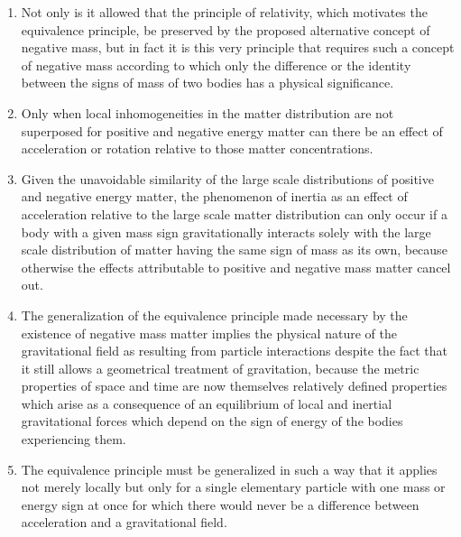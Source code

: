 \documentclass[notitlepage,12pt]{report}
\begin{document}
\begin{enumerate}
\item Not only is it allowed that the principle of relativity, which motivates the equivalence principle, be preserved by the proposed alternative concept of negative mass, but in fact it is this very principle that requires such a concept of negative mass according to which only the difference or the identity between the signs of mass of two bodies has a physical significance.

\item Only when local inhomogeneities in the matter distribution are not superposed for positive and negative energy matter can there be an effect of acceleration or rotation relative to those matter concentrations.

\item Given the unavoidable similarity of the large scale distributions of positive and negative energy matter, the phenomenon of inertia as an effect of acceleration relative to the large scale matter distribution can only occur if a body with a given mass sign gravitationally interacts solely with the large scale distribution of matter having the same sign of mass as its own, because otherwise the effects attributable to positive and negative mass matter cancel out.

\item The generalization of the equivalence principle made necessary by the existence of negative mass matter implies the physical nature of the gravitational field as resulting from particle interactions despite the fact that it still allows a geometrical treatment of gravitation, because the metric properties of space and time are now themselves relatively defined properties which arise as a consequence of an equilibrium of local and inertial gravitational forces which depend on the sign of energy of the bodies experiencing them.

\item The equivalence principle must be generalized in such a way that it applies not merely locally but only for a single elementary particle with one mass or energy sign at once for which there would never be a difference between acceleration and a gravitational field.


\end{enumerate}
\end{document}
